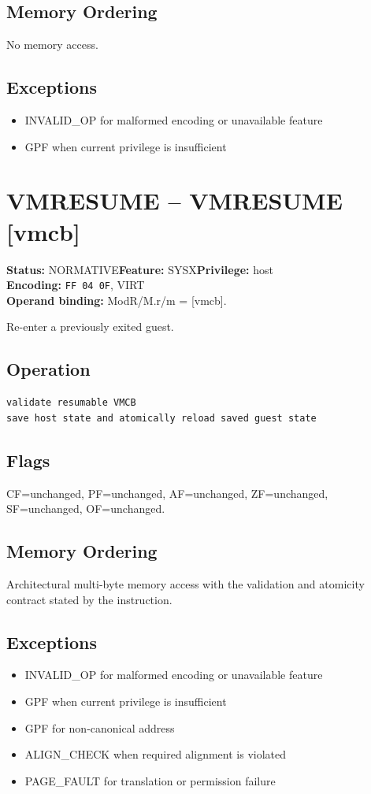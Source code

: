 \documentclass[10pt]{article}
\begin{document}
\subsection*{Memory Ordering}
No memory access.
\subsection*{Exceptions}
\begin{itemize}
\item INVALID\_OP for malformed encoding or unavailable feature
\item GPF when current privilege is insufficient
\end{itemize}
\clearpage

\section{VMRESUME -- VMRESUME [vmcb]}
\textbf{Status:} NORMATIVE\quad \textbf{Feature:} SYSX\quad \textbf{Privilege:} host\\
\textbf{Encoding:} \texttt{FF 04 0F}, VIRT\\
\textbf{Operand binding:} ModR/M.r/m = [vmcb].

Re-enter a previously exited guest.

\subsection*{Operation}
\begin{lstlisting}
validate resumable VMCB
save host state and atomically reload saved guest state
\end{lstlisting}
\subsection*{Flags}
CF=unchanged, PF=unchanged, AF=unchanged, ZF=unchanged, SF=unchanged, OF=unchanged.
\subsection*{Memory Ordering}
Architectural multi-byte memory access with the validation and atomicity contract stated by the instruction.
\subsection*{Exceptions}
\begin{itemize}
\item INVALID\_OP for malformed encoding or unavailable feature
\item GPF when current privilege is insufficient
\item GPF for non-canonical address
\item ALIGN\_CHECK when required alignment is violated
\item PAGE\_FAULT for translation or permission failure
\end{itemize}
\clearpage
\end{document}
